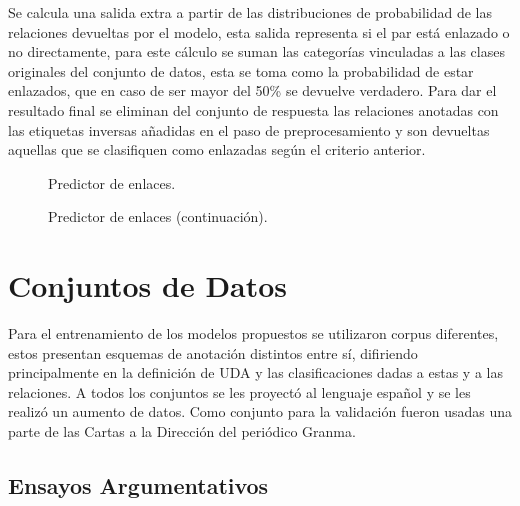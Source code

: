 \documentclass[a4paper,11pt,twocolumn,twoside]{article}
\begin{document}
Se calcula una salida extra a partir de las distribuciones de probabilidad de las relaciones 
devueltas por el modelo, esta salida representa si el par está enlazado o no directamente, para este cálculo se 
suman las categorías vinculadas a las clases originales del conjunto de datos, esta se toma como la probabilidad de estar 
enlazados, que en caso de ser mayor del 50\% se devuelve verdadero. Para dar el resultado final se eliminan del 
conjunto de respuesta las relaciones anotadas con las etiquetas inversas añadidas en el paso de preprocesamiento 
y son devueltas aquellas que se clasifiquen como enlazadas según el criterio anterior.

\begin{figure}[h]
	\centering
	
	\caption{Predictor de enlaces.}
	\label{fig:link_predictor_model1}
\end{figure}
\begin{figure}[h]
	\centering
	
	\caption{Predictor de enlaces (continuación).}
	\label{fig:link_predictor_model2}
\end{figure}

\section{Conjuntos de Datos}

Para el entrenamiento de los modelos propuestos se utilizaron corpus diferentes, estos
presentan esquemas de anotación distintos entre sí, difiriendo principalmente en la definición de UDA y 
las clasificaciones dadas a estas y a las relaciones. A todos los conjuntos se les proyectó al lenguaje 
español y se les realizó un aumento de datos. Como conjunto para la validación fueron usadas 
una parte de las Cartas a la Dirección del periódico Granma.

\subsection{Ensayos Argumentativos}\label{corpus:persuasive_essays}
\end{document}
